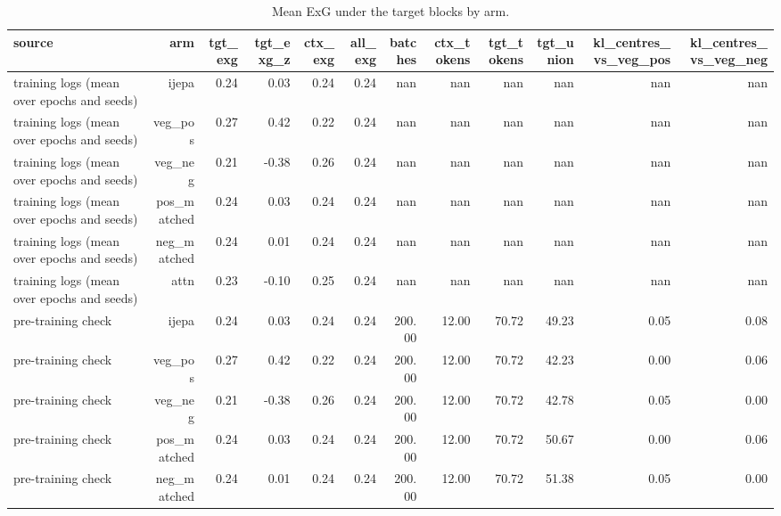 \begin{table}[t]
\centering
\small
\caption{Mean ExG under the target blocks by arm.}
\label{tab:manipulation_check}
\begin{tabular}{lrrrrrrrrrrr}
\toprule
source & arm & tgt\_exg & tgt\_exg\_z & ctx\_exg & all\_exg & batches & ctx\_tokens & tgt\_tokens & tgt\_union & kl\_centres\_vs\_veg\_pos & kl\_centres\_vs\_veg\_neg \\
\midrule
training logs (mean over epochs and seeds) & ijepa & 0.24 & 0.03 & 0.24 & 0.24 & nan & nan & nan & nan & nan & nan \\
training logs (mean over epochs and seeds) & veg\_pos & 0.27 & 0.42 & 0.22 & 0.24 & nan & nan & nan & nan & nan & nan \\
training logs (mean over epochs and seeds) & veg\_neg & 0.21 & -0.38 & 0.26 & 0.24 & nan & nan & nan & nan & nan & nan \\
training logs (mean over epochs and seeds) & pos\_matched & 0.24 & 0.03 & 0.24 & 0.24 & nan & nan & nan & nan & nan & nan \\
training logs (mean over epochs and seeds) & neg\_matched & 0.24 & 0.01 & 0.24 & 0.24 & nan & nan & nan & nan & nan & nan \\
training logs (mean over epochs and seeds) & attn & 0.23 & -0.10 & 0.25 & 0.24 & nan & nan & nan & nan & nan & nan \\
pre-training check & ijepa & 0.24 & 0.03 & 0.24 & 0.24 & 200.00 & 12.00 & 70.72 & 49.23 & 0.05 & 0.08 \\
pre-training check & veg\_pos & 0.27 & 0.42 & 0.22 & 0.24 & 200.00 & 12.00 & 70.72 & 42.23 & 0.00 & 0.06 \\
pre-training check & veg\_neg & 0.21 & -0.38 & 0.26 & 0.24 & 200.00 & 12.00 & 70.72 & 42.78 & 0.05 & 0.00 \\
pre-training check & pos\_matched & 0.24 & 0.03 & 0.24 & 0.24 & 200.00 & 12.00 & 70.72 & 50.67 & 0.00 & 0.06 \\
pre-training check & neg\_matched & 0.24 & 0.01 & 0.24 & 0.24 & 200.00 & 12.00 & 70.72 & 51.38 & 0.05 & 0.00 \\
\bottomrule
\end{tabular}
\end{table}
